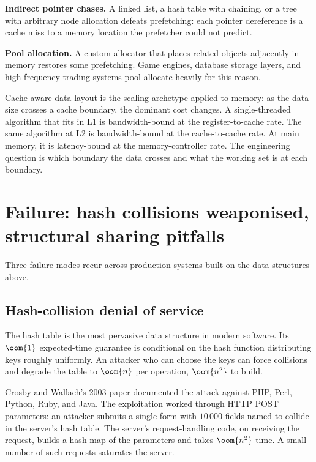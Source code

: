 \textbf{Indirect pointer chases.} A linked list, a hash table with chaining, or a tree with arbitrary node allocation defeats prefetching: each pointer dereference is a cache miss to a memory location the prefetcher could not predict.

\textbf{Pool allocation.} A custom allocator that places related objects adjacently in memory restores some prefetching. Game engines, database storage layers, and high-frequency-trading systems pool-allocate heavily for this reason.

\begin{archetype}[Scaling]
Cache-aware data layout is the scaling archetype applied to memory: as the data size crosses a cache boundary, the dominant cost changes. A single-threaded algorithm that fits in L1 is bandwidth-bound at the register-to-cache rate. The same algorithm at L2 is bandwidth-bound at the cache-to-cache rate. At main memory, it is latency-bound at the memory-controller rate. The engineering question is which boundary the data crosses and what the working set is at each boundary.
\end{archetype}

\section{Failure: hash collisions weaponised, structural sharing pitfalls}

Three failure modes recur across production systems built on the data structures above.

\subsection{Hash-collision denial of service}

The hash table is the most pervasive data structure in modern software. Its $\oom{1}$ expected-time guarantee is conditional on the hash function distributing keys roughly uniformly. An attacker who can choose the keys can force collisions and degrade the table to $\oom{n}$ per operation, $\oom{n^2}$ to build.

Crosby and Wallach's 2003 paper documented the attack against PHP, Perl, Python, Ruby, and Java. The exploitation worked through HTTP POST parameters: an attacker submits a single form with $10\,000$ fields named to collide in the server's hash table. The server's request-handling code, on receiving the request, builds a hash map of the parameters and takes $\oom{n^2}$ time. A small number of such requests saturates the server.

